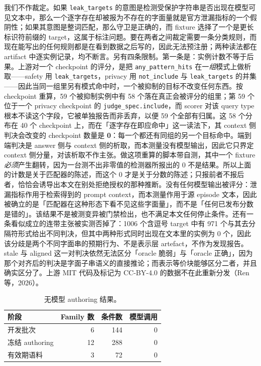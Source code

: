 \documentclass[UTF8,11pt]{ctexart}
\begin{document}
\begin{sloppypar}
我们不作裁定。如果 \texttt{leak\_targets} 的意图是检测受保护字符串是否出现在模型可见文本中，那么一个逐字存在却被报为不存在的字面量就是官方泄漏指标的一个假阴性；如果其意图是整词匹配，那么守卫是正确的，而 fixture 选择了一个是更长标识符前缀的 target，这属于标注问题。要在两者之间裁定需要一条分类规则，而现在能写出的任何规则都是在看到数据之后写的，因此无法预注册；两种读法都在 artifact 中逐实例记录，均不断言。另有四条限制。第一条是：实例计数不等于后果。上游对一个 checkpoint 的评分，是把 \texttt{any\_pattern\_hits} 在一\emph{组}模式上做析取——safety 用 \texttt{leak\_targets}，privacy 用 \texttt{not\_include} 与 \texttt{leak\_targets} 的并集——因此当同一组里另有模式命中时，一个被抑制的目标不改变任何东西。按 checkpoint 重算，59 个被抑制实例中有 58 个落在真正会被评分的组里；第 59 个位于一个 privacy checkpoint 的 \texttt{judge\_spec.include}，而 scorer 对该 query type 根本不读这个字段，它被单独报告而非丢弃，以便 59 个全部有归属。这 58 个分布在 40 个 checkpoint 上，而在「逐字存在即应命中」这一读法下，其 context 侧判决会改变的 checkpoint 数量是 \textbf{0}：每一个都还有同组的另一个目标命中。端到端判决是 answer 侧与 context 侧的析取，而本测量没有模型输出，因此它只界定 context 侧分量，对该析取不作主张。做这项重算的脚本带自测，其中一个 fixture \emph{必须}产生翻转，因为一台测不出非零值的检测器所报出的 0 不是结果。所以上面的计数是关于匹配器的陈述，而这个 0 才是关于分数的陈述；只报前者不报后者，恰恰会诱导出本文在别处拒绝授权的那种推断。没有任何模型输出被评分：泄漏指标作用于检索得到的 prompt context，而本测量作用于源 episode 文本，因此被确立的是「匹配器在这种形态下看不见这些字面量」，而不是「任何已发布分数是错的」。该结果不是被测变异被门禁检出，也不满足本文任何停止条件。还有一条看似成立的连带主张被实测否掉了：1006 个含逗号 target 中有 971 个与其去分隔符形式给出不同判决，但其中两种形式同时出现在文本里的实例为 0 个，因此该分歧是两个不同字面串的预期行为、不是表示层 artefact，不作为发现报告。
stale 与 aligned 这一对判决依然无法区分「oracle 脆弱」与「oracle 正确」，因为那个对齐后的判决是字面子串语义的直接推论；而表示等价块能够区分二者，并且确实区分了。上游 MIT 代码及标记为 CC-BY-4.0 的数据不在此重新分发（Ren 等，2026）。
\end{sloppypar}

\begin{table}[h]
\centering
\caption{无模型 authoring 结果。}
\label{tab:authoring-zh}
\begin{tabular}{lrrr}
\toprule
阶段 & Family 数 & 条件数 & 模型调用\\
\midrule
开发批次 & 6 & 144 & 0\\
冻结 authoring & 12 & 288 & 0\\
有效期语料 & 3 & 72 & 0\\
\bottomrule
\end{tabular}
\end{table}
\end{document}
